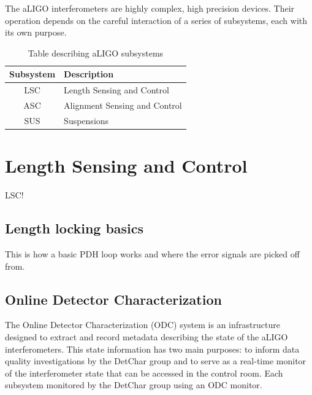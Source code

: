 The aLIGO interferometers are highly complex, high precision devices. 
Their operation depends on the careful interaction of a series of subsystems, 
each with its own purpose. 

\begin{table}[ht!]%
  \begin{center}
    \begin{tabular}{|c|l|}
    \hline
    Subsystem & Description \\
    \hline
    LSC & Length Sensing and Control \\
    \hline
    ASC & Alignment Sensing and Control \\
    \hline 
    SUS & Suspensions \\
    \hline
    \end{tabular}
  \end{center}
  \caption[Table of aLIGO subsytems]{Table describing aLIGO subsystems}
  \label{table:aligo-subsystems}
\end{table}

\section{Length Sensing and Control}
LSC!

\subsection{Length locking basics}

This is how a basic PDH loop works and where the error signals are picked 
off from.

\subsection{Online Detector Characterization}

The Online Detector Characterization (ODC) system is an infrastructure designed
to extract and record metadata describing the state of the aLIGO interferometers.
This state information has two main purposes: to inform data quality investigations
by the DetChar group and to serve as a real-time monitor of the interferometer state
that can be accessed in the control room. Each subsystem monitored by the DetChar group
using an ODC monitor.

